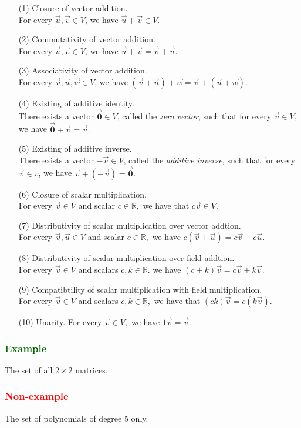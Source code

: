 \documentclass[a4paper,12pt]{article}
\begin{document}
\begin{itemize}
    \item [(1)] Closure of vector addition.\\ For every $\vec{u},\vec{v} \in V$, we have $\vec{u}+\vec{v}\in V.$
    \item [(2)] Commutativity of vector addition.\\ For every $\vec{u},\vec{v} \in V$, we have $\vec{u}+\vec{v} = \vec{v}+\vec{u}.$
    \item [(3)] Associativity of vector addition.\\ For every $\vec{v},\vec{u},\vec{w} \in V$, we have $(\vec{v}+\vec{u})+\vec{w}=\vec{v}+(\vec{u}+\vec{w}).$
    \item [(4)] Existing of additive identity.\\ There exists a vector $\vec{\textbf{0}}\in V$, called the \textit{zero vector}, such that for every $\vec{v}\in V$, we have $\vec{\textbf{0}}+\vec{v}=\vec{v}.$
    \item [(5)] Existing of additive inverse.\\ There exists a vector $-\vec{v} \in V$, called the \textit{additive inverse,} such that for every $\vec{v} \in v$, we have $\vec{v}+(-\vec{v})=\vec{\textbf{0}}.$
    \item [(6)] Closure of scalar multiplication.\\ For every $\vec{v} \in V$ and scalar $c \in \mathbb{R},$ we have that $c\vec{v} \in V.$
    \item [(7)] Distributivity of scalar multiplication over vector addtion. \\ For every $\vec{v},\vec{u} \in V$ and scalar $c \in \mathbb{R},$ we have $c(\vec{v}+\vec{u})=c\vec{v}+c\vec{u}.$
    \item [(8)] Distributivity of scalar multiplication over field addtion.\\ For every $\vec{v} \in V$ and scalars $c,k \in \mathbb{R}.$ we have $(c+k)\vec{v}=c\vec{v}+k\vec{v}.$
    \item [(9)] Compatibtility of scalar multiplication with field multiplication.\\ For every $\vec{v}\in V$ and scalars $c,k \in \mathbb{R},$ we have that $(ck)\vec{v}=c(k\vec{v}).$ 
    \item [(10)] Unarity. For every $\vec{v} \in V,$ we have $1\vec{v}=\vec{v}.$
\end{itemize}
\begin{multicols}{2}
    \subsubsection*{\textcolor{darkgreen}{Example}}
    The set of all $2 \times 2$ matrices.
    \subsubsection*{\textcolor{red}{Non-example}}
    The set of polynomials of degree $5$ only.
\end{multicols}
\end{document}
